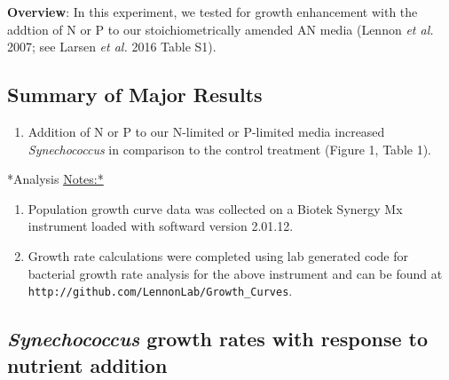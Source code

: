 \documentclass[]{article}
\providecommand{\tightlist}{%
  \setlength{\itemsep}{0pt}\setlength{\parskip}{0pt}}
\begin{document}
\textbf{Overview}: In this experiment, we tested for growth enhancement
with the addtion of N or P to our stoichiometrically amended AN media
(Lennon \emph{et al.} 2007; see Larsen \emph{et al.} 2016 Table S1).

\subsection{Summary of Major Results}\label{summary-of-major-results}

\begin{enumerate}
\def\labelenumi{\arabic{enumi}.}
\tightlist
\item
  Addition of N or P to our N-limited or P-limited media increased
  \emph{Synechococcus} in comparison to the control treatment (Figure 1,
  Table 1).
\end{enumerate}

*Analysis \url{Notes:*}

\begin{enumerate}
\def\labelenumi{\arabic{enumi}.}
\tightlist
\item
  Population growth curve data was collected on a Biotek Synergy Mx
  instrument loaded with softward version 2.01.12.
\item
  Growth rate calculations were completed using lab generated code for
  bacterial growth rate analysis for the above instrument and can be
  found at \texttt{http://github.com/LennonLab/Growth\_Curves}.
\end{enumerate}

\newpage

\subsection{\texorpdfstring{\emph{Synechococcus} growth rates with
response to nutrient
addition}{Synechococcus growth rates with response to nutrient addition}}\label{synechococcus-growth-rates-with-response-to-nutrient-addition}
\end{document}
